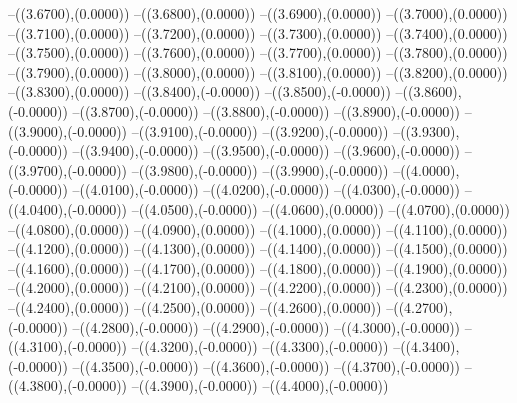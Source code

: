 {	--({\sx*(3.6700)},{\sy*(0.0000)})
	--({\sx*(3.6800)},{\sy*(0.0000)})
	--({\sx*(3.6900)},{\sy*(0.0000)})
	--({\sx*(3.7000)},{\sy*(0.0000)})
	--({\sx*(3.7100)},{\sy*(0.0000)})
	--({\sx*(3.7200)},{\sy*(0.0000)})
	--({\sx*(3.7300)},{\sy*(0.0000)})
	--({\sx*(3.7400)},{\sy*(0.0000)})
	--({\sx*(3.7500)},{\sy*(0.0000)})
	--({\sx*(3.7600)},{\sy*(0.0000)})
	--({\sx*(3.7700)},{\sy*(0.0000)})
	--({\sx*(3.7800)},{\sy*(0.0000)})
	--({\sx*(3.7900)},{\sy*(0.0000)})
	--({\sx*(3.8000)},{\sy*(0.0000)})
	--({\sx*(3.8100)},{\sy*(0.0000)})
	--({\sx*(3.8200)},{\sy*(0.0000)})
	--({\sx*(3.8300)},{\sy*(0.0000)})
	--({\sx*(3.8400)},{\sy*(-0.0000)})
	--({\sx*(3.8500)},{\sy*(-0.0000)})
	--({\sx*(3.8600)},{\sy*(-0.0000)})
	--({\sx*(3.8700)},{\sy*(-0.0000)})
	--({\sx*(3.8800)},{\sy*(-0.0000)})
	--({\sx*(3.8900)},{\sy*(-0.0000)})
	--({\sx*(3.9000)},{\sy*(-0.0000)})
	--({\sx*(3.9100)},{\sy*(-0.0000)})
	--({\sx*(3.9200)},{\sy*(-0.0000)})
	--({\sx*(3.9300)},{\sy*(-0.0000)})
	--({\sx*(3.9400)},{\sy*(-0.0000)})
	--({\sx*(3.9500)},{\sy*(-0.0000)})
	--({\sx*(3.9600)},{\sy*(-0.0000)})
	--({\sx*(3.9700)},{\sy*(-0.0000)})
	--({\sx*(3.9800)},{\sy*(-0.0000)})
	--({\sx*(3.9900)},{\sy*(-0.0000)})
	--({\sx*(4.0000)},{\sy*(-0.0000)})
	--({\sx*(4.0100)},{\sy*(-0.0000)})
	--({\sx*(4.0200)},{\sy*(-0.0000)})
	--({\sx*(4.0300)},{\sy*(-0.0000)})
	--({\sx*(4.0400)},{\sy*(-0.0000)})
	--({\sx*(4.0500)},{\sy*(-0.0000)})
	--({\sx*(4.0600)},{\sy*(0.0000)})
	--({\sx*(4.0700)},{\sy*(0.0000)})
	--({\sx*(4.0800)},{\sy*(0.0000)})
	--({\sx*(4.0900)},{\sy*(0.0000)})
	--({\sx*(4.1000)},{\sy*(0.0000)})
	--({\sx*(4.1100)},{\sy*(0.0000)})
	--({\sx*(4.1200)},{\sy*(0.0000)})
	--({\sx*(4.1300)},{\sy*(0.0000)})
	--({\sx*(4.1400)},{\sy*(0.0000)})
	--({\sx*(4.1500)},{\sy*(0.0000)})
	--({\sx*(4.1600)},{\sy*(0.0000)})
	--({\sx*(4.1700)},{\sy*(0.0000)})
	--({\sx*(4.1800)},{\sy*(0.0000)})
	--({\sx*(4.1900)},{\sy*(0.0000)})
	--({\sx*(4.2000)},{\sy*(0.0000)})
	--({\sx*(4.2100)},{\sy*(0.0000)})
	--({\sx*(4.2200)},{\sy*(0.0000)})
	--({\sx*(4.2300)},{\sy*(0.0000)})
	--({\sx*(4.2400)},{\sy*(0.0000)})
	--({\sx*(4.2500)},{\sy*(0.0000)})
	--({\sx*(4.2600)},{\sy*(0.0000)})
	--({\sx*(4.2700)},{\sy*(-0.0000)})
	--({\sx*(4.2800)},{\sy*(-0.0000)})
	--({\sx*(4.2900)},{\sy*(-0.0000)})
	--({\sx*(4.3000)},{\sy*(-0.0000)})
	--({\sx*(4.3100)},{\sy*(-0.0000)})
	--({\sx*(4.3200)},{\sy*(-0.0000)})
	--({\sx*(4.3300)},{\sy*(-0.0000)})
	--({\sx*(4.3400)},{\sy*(-0.0000)})
	--({\sx*(4.3500)},{\sy*(-0.0000)})
	--({\sx*(4.3600)},{\sy*(-0.0000)})
	--({\sx*(4.3700)},{\sy*(-0.0000)})
	--({\sx*(4.3800)},{\sy*(-0.0000)})
	--({\sx*(4.3900)},{\sy*(-0.0000)})
	--({\sx*(4.4000)},{\sy*(-0.0000)})
}

